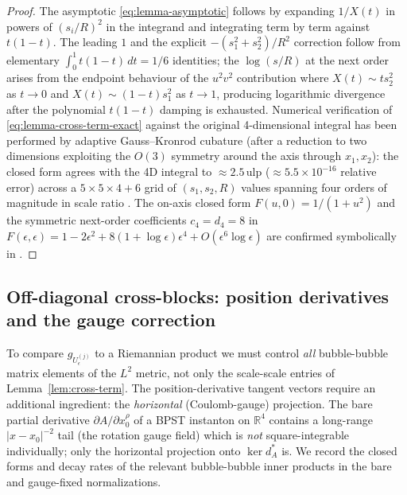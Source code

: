 \documentclass[11pt,letterpaper]{article}
\theoremstyle{definition}
\newcommand{\bbR}{\mathbb{R}}
\begin{document}
\begin{proof}
The asymptotic \eqref{eq:lemma-asymptotic} follows by expanding $1/X(t)$ in powers of $(s_i/R)^2$ in the integrand and integrating term by term against $t(1-t)$. The leading $1$ and the explicit $-(s_1^2+s_2^2)/R^2$ correction follow from elementary $\int_0^1 t(1-t)\,dt = 1/6$ identities; the $\log(s/R)$ at the next order arises from the endpoint behaviour of the $u^2 v^2$ contribution where $X(t) \sim t s_2^2$ as $t \to 0$ and $X(t) \sim (1-t) s_1^2$ as $t \to 1$, producing logarithmic divergence after the polynomial $t(1-t)$ damping is exhausted. Numerical verification of \eqref{eq:lemma-cross-term-exact} against the original 4-dimensional integral has been performed by adaptive Gauss--Kronrod cubature (after a reduction to two dimensions exploiting the $O(3)$ symmetry around the axis through $x_1, x_2$): the closed form agrees with the 4D integral to $\approx 2.5\,\mathrm{ulp}$ ($\approx 5.5\times 10^{-16}$ relative error) across a $5\times 5\times 4 + 6$ grid of $(s_1, s_2, R)$ values spanning four orders of magnitude in scale ratio \cite{lemma-ct-rust}. The on-axis closed form $F(u,0) = 1/(1+u^2)$ and the symmetric next-order coefficients $c_4 = d_4 = 8$ in $F(\epsilon, \epsilon) = 1 - 2\epsilon^2 + 8(1+\log\epsilon)\epsilon^4 + O(\epsilon^6\log\epsilon)$ are confirmed symbolically in \cite{lemma-ct-higher-order}.
\end{proof}

\subsection{Off-diagonal cross-blocks: position derivatives and the gauge correction}

To compare $g_{U_\epsilon^{(j)}}$ to a Riemannian product we must control \emph{all} bubble-bubble matrix elements of the $L^2$ metric, not only the scale-scale entries of Lemma~\ref{lem:cross-term}. The position-derivative tangent vectors require an additional ingredient: the \emph{horizontal} (Coulomb-gauge) projection. The bare partial derivative $\partial A/\partial x_0^\rho$ of a BPST instanton on $\bbR^4$ contains a long-range $|x-x_0|^{-2}$ tail (the rotation gauge field) which is \emph{not} square-integrable individually; only the horizontal projection onto $\ker d_A^*$ is. We record the closed forms and decay rates of the relevant bubble-bubble inner products in the bare and gauge-fixed normalizations.
\end{document}

